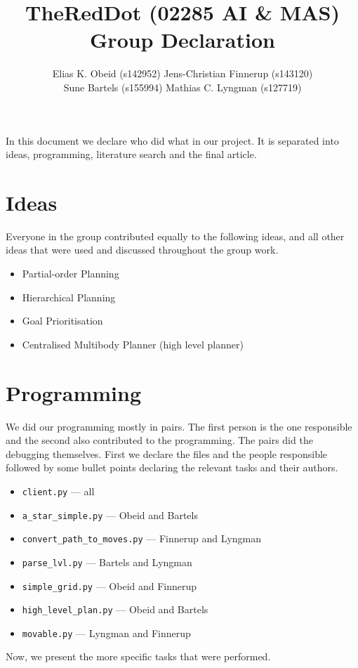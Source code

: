 \documentclass[a4paper]{article}
\title{TheRedDot (02285 AI \& MAS)\\Group Declaration}
\author{
  Elias K. Obeid (s142952) \hspace{10pt}
Jens-Christian Finnerup (s143120)\\
Sune Bartels  (s155994) \hspace{10pt}
Mathias C. Lyngman (s127719)}
\newcommand{\jens}{Finnerup}
\newcommand{\sune}{Bartels}
\newcommand{\superdude}{Lyngman}
\newcommand{\elias}{Obeid}
\begin{document}
\maketitle

In this document we declare who did what in our project. It is separated into
ideas, programming, literature search and the final article.

\section{Ideas}
Everyone in the group contributed equally to the following ideas, and all other ideas that were used and discussed throughout the group work.
\begin{itemize}
  \item Partial-order Planning
  \item Hierarchical Planning
  \item Goal Prioritisation
  \item Centralised Multibody Planner (high level planner)
\end{itemize}

\section{Programming}
We did our programming mostly in pairs. 
The first person is the one responsible and the second also contributed to the programming. 
The pairs did the debugging themselves.
First we declare the files and the people responsible followed by some bullet points declaring the relevant tasks and their authors.

\begin{itemize}
  \item \texttt{client.py} --- all
  \item \texttt{a\_star\_simple.py} --- \elias{} and \sune
  \item \texttt{convert\_path\_to\_moves.py} --- \jens{} and \superdude
  \item \texttt{parse\_lvl.py} --- \sune{} and \superdude
  \item \texttt{simple\_grid.py} --- \elias{} and \jens
  \item \texttt{high\_level\_plan.py} --- \elias{} and \sune
  \item \texttt{movable.py} --- \superdude{} and \jens
\end{itemize}

Now, we present the more specific tasks that were performed.    
\end{document}
